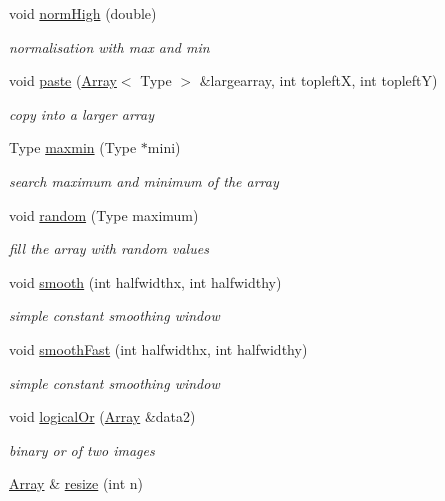 \begin{DoxyCompactItemize}
void \hyperlink{classArray_ae665ee475059fe98b5e8f7a1d63efd6e}{norm\+High} (double)
\begin{DoxyCompactList}\small\item\em normalisation with max and min \end{DoxyCompactList}\item 
void \hyperlink{classArray_a899d6e0ae0758c1d6bfce45428215fbe}{paste} (\hyperlink{classArray}{Array}$<$ Type $>$ \&largearray, int topleftX, int topleftY)
\begin{DoxyCompactList}\small\item\em copy into a larger array \end{DoxyCompactList}\item 
Type \hyperlink{classArray_ab86f2cd9006ea12400a1fe3ecc70b507}{maxmin} (Type $\ast$mini)
\begin{DoxyCompactList}\small\item\em search maximum and minimum of the array \end{DoxyCompactList}\item 
void \hyperlink{classArray_a0fba9420565845ed9a2c0c64c58cf83e}{random} (Type maximum)
\begin{DoxyCompactList}\small\item\em fill the array with random values \end{DoxyCompactList}\item 
void \hyperlink{classArray_a4ee10b16eaa6c7c52704e43943ef38c8}{smooth} (int halfwidthx, int halfwidthy)
\begin{DoxyCompactList}\small\item\em simple constant smoothing window \end{DoxyCompactList}\item 
void \hyperlink{classArray_a121e8b26d85e237bdc46375178e6cab2}{smooth\+Fast} (int halfwidthx, int halfwidthy)
\begin{DoxyCompactList}\small\item\em simple constant smoothing window \end{DoxyCompactList}\item 
void \hyperlink{classArray_a5c24e55bdcdb23ce73c95b80aac8961d}{logical\+Or} (\hyperlink{classArray}{Array} \&data2)
\begin{DoxyCompactList}\small\item\em binary or of two images \end{DoxyCompactList}\item 
\hyperlink{classArray}{Array} \& \hyperlink{classArray_a9ec322b5cf0d30954781058862788cd7}{resize} (int n)

\end{DoxyCompactItemize}
